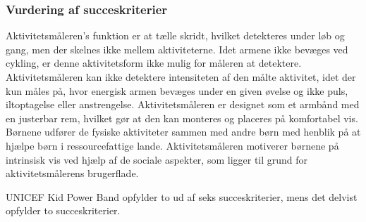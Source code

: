 \subsubsection{Vurdering af succeskriterier}
Aktivitetsmåleren's funktion er at tælle skridt, hvilket detekteres under løb og gang, men der skelnes ikke mellem aktiviteterne. Idet armene ikke bevæges ved cykling, er denne aktivitetsform ikke mulig for måleren at detektere. Aktivitetsmåleren kan ikke detektere intensiteten af den målte aktivitet, idet der kun måles på, hvor energisk armen bevæges under en given øvelse og ikke puls, iltoptagelse eller anstrengelse. %
Aktivitetsmåleren er designet som et armbånd med en justerbar rem, hvilket gør at den kan monteres og placeres på komfortabel vis. \citep{PowerManual2015} \newline
Børnene udfører de fysiske aktiviteter sammen med andre børn med henblik på at hjælpe børn i ressourcefattige lande. Aktivitetsmåleren motiverer børnene på intrinsisk vis ved hjælp af de sociale aspekter, som ligger til grund for aktivitetsmålerens brugerflade.%
\citep{PowerAbout2015} 

UNICEF Kid Power Band opfylder to ud af seks succeskriterier, mens det delvist opfylder to succeskriterier.

